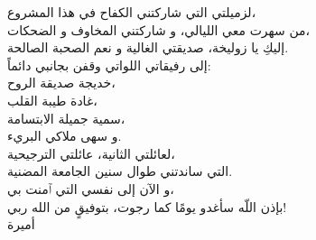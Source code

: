 \begin{RLtext}
لزميلتي التي شاركتني الكفاح في هذا المشروع، \\
من سهرت معي الليالي، و شاركتني المخاوف و الضحكات، \\
إليكِ يا زوليخة، صديقتي الغالية و نعم الصحبة الصالحة. \\[2em]

إلى رفيقاتي اللواتي وقفن بجانبي دائماً: \\
خديجة صديقة الروح، \\
غادة طيبة القلب، \\
سمية جميلة الابتسامة، \\
و سهى ملاكي البريء. \\[2em]

لعائلتي الثانية، عائلتي الترجيحية، \\
التي ساندتني طوال سنين الجامعة المضنية. \\[2em]

و الآن إلى نفسي التي ٱمنت بي، \\
بإذن اللّه سأغدو يومًا كما رجوت، بتوفيقٍ من الله ربي! \\[3em]

\hfill أميرة
\end{RLtext}

\pagebreak
